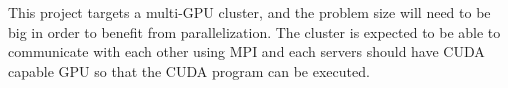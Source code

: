 This project targets a multi-GPU cluster, and the problem size will need to be big in order to benefit from parallelization. The cluster is expected to be able to communicate with each other using MPI and each servers should have CUDA capable GPU so that the CUDA program can be executed.